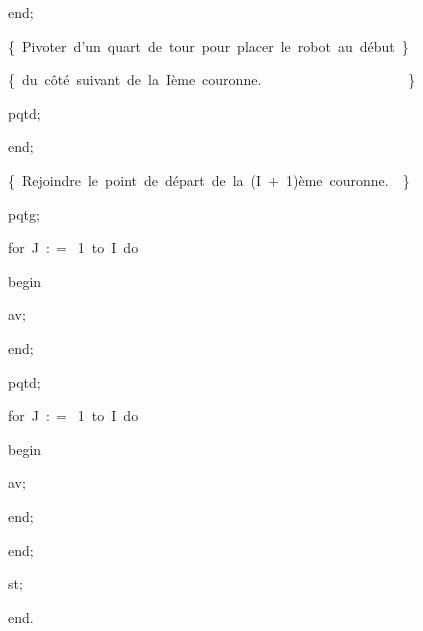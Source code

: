 {\vspace{\neglskip}\mbox{\blc  \blk\blk\blk\blk\blk\blk\blk\blk\idt  \mcl end\idt $;$}\par 
\vspace{\neglskip}\mbox{\blc  \blk\blk\blk\blk\blk\blk\idt  \cmt  \{\ Pivoter\ d{'}un\ quart\ de\ tour\ pour\ placer\ le\ robot\ au\ début\ \}\idt }\par 
\vspace{\neglskip}\mbox{\blc  \blk\blk\blk\blk\blk\blk\idt  \cmt  \{\ du\ côté\ suivant\ de\ la\ Ième\ couronne.\ \ \ \ \ \ \ \ \ \ \ \ \ \ \ \ \ \ \ \ \ \}\idt }\par 
\vspace{\neglskip}\mbox{\blc  \blk\blk\blk\blk\blk\blk\idt  pqtd$;$}\par 
\vspace{\neglskip}\mbox{\blc  \blk\blk\blk\blk\idt  \mcl end\idt $;$}\par 
\vspace{\neglskip}\mbox{\blc  \blk\blk\blk\idt  \cmt  \{\ Rejoindre\ le\ point\ de\ départ\ de\ la\ (I\ +\ 1)ème\ couronne.\ \ \}\idt }\par 
\vspace{\neglskip}\mbox{\blc  \blk\blk\blk\idt  pqtg$;$}\par 
\pagebreak[3] 
\vspace{\neglskip}\mbox{\blc  \blk\blk\blk\idt  \mcl for\idt \ J\ $:$$=$\ 1\ \mcl to\idt \ I\ \mcl do\idt }\par 
\vspace{\neglskip}\mbox{\blc  \blk\blk\blk\blk\idt  \mcl begin\idt }\par 
\vspace{\neglskip}\mbox{\blc  \blk\blk\blk\blk\blk\idt  av$;$}\par 
\vspace{\neglskip}\mbox{\blc  \blk\blk\blk\blk\idt  \mcl end\idt $;$}\par 
\vspace{\neglskip}\mbox{\blc  \blk\blk\blk\idt  pqtd$;$}\par 
\pagebreak[3] 
\vspace{\neglskip}\mbox{\blc  \blk\blk\blk\idt  \mcl for\idt \ J\ $:$$=$\ 1\ \mcl to\idt \ I\ \mcl do\idt }\par 
\vspace{\neglskip}\mbox{\blc  \blk\blk\blk\blk\idt  \mcl begin\idt }\par 
\vspace{\neglskip}\mbox{\blc  \blk\blk\blk\blk\blk\idt  av$;$}\par 
\vspace{\neglskip}\mbox{\blc  \blk\blk\blk\blk\idt  \mcl end\idt $;$}\par 
\vspace{\neglskip}\mbox{\blc  \blk\blk\idt  \mcl end\idt $;$}\par 
\vspace{\neglskip}\mbox{\blc  \blk\idt  st$;$}\par 
\vspace{\neglskip}\mbox{\blc  \idt  \mcl end\idt $.$}\par 

\medskip }

